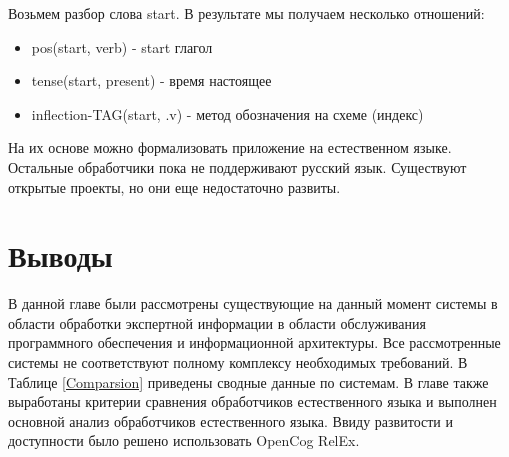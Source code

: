 Возьмем разбор слова start. В результате мы получаем несколько отношений:
\begin{itemize}
	\item pos(start, verb) - start глагол
	\item tense(start, present) - время настоящее
	\item inflection-TAG(start, .v) -  метод обозначения на схеме (индекс)
\end{itemize}

На их основе можно формализовать приложение на естественном языке. Остальные обработчики пока не поддерживают русский язык. Существуют открытые проекты, но они еще недостаточно развиты.
\section{Выводы}
В данной главе были рассмотрены существующие на данный момент системы в области обработки экспертной информации в области обслуживания программного обеспечения и информационной архитектуры.
Все рассмотренные системы не соответствуют полному комплексу необходимых требований. В Таблице \ref{Comparsion} приведены сводные данные по системам. В главе также выработаны критерии сравнения обработчиков естественного языка и выполнен основной анализ обработчиков естественного языка. Ввиду развитости и доступности было решено использовать OpenCog RelEx.

